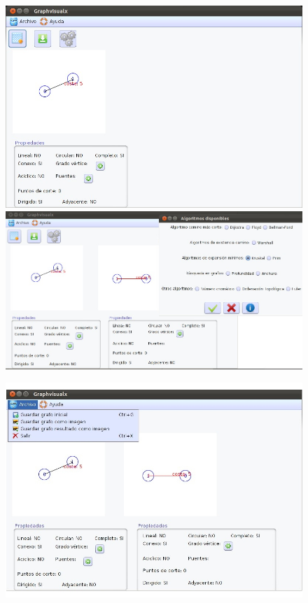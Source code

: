 \begin{itemize}
\begin{figure}[H]
\end{figure}
\newpage
\begin{figure}[H]
\begin{center}
\includegraphics[width=14cm]{./imagenes_documentacion/Graphvisualx_14_11_2011/captura_3.jpeg}
\includegraphics[width=15cm]{./imagenes_documentacion/Graphvisualx_14_11_2011/captura_4.jpeg}
\end{center}
\end{figure}
\newpage
\begin{figure}[H]
\begin{center}
\includegraphics[width=15cm]{./imagenes_documentacion/Graphvisualx_14_11_2011/captura_5.jpeg}
\end{center}
\end{figure}


\end{itemize}
